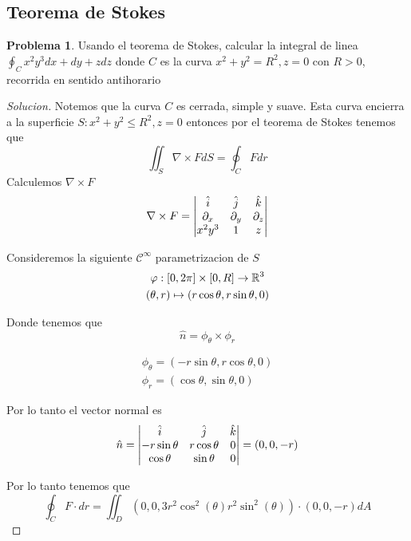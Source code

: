 \documentclass{article}
\theoremstyle{definition}
\newtheorem{problem}{Problema}
\newenvironment{solution}{\begin{proof}[Solucion]}{\end{proof}}
\begin{document}
\subsection{Teorema de Stokes}
\begin{problem}
Usando el teorema de Stokes, calcular la integral de linea $\oint_{C} x^{2}y^{3} dx + dy + z dz$ donde $C$ es la curva $x^{2} + y^{2} = R^{2}, z = 0$ con $R > 0$, recorrida en sentido antihorario
\end{problem}
\begin{solution}
  Notemos que la curva $C$ es cerrada, simple y suave. Esta curva encierra a la superficie $S: x^{2} + y^{2} \leq R^{2}, z = 0$ entonces por el teorema de Stokes tenemos que
  \begin{equation*}
    \iint_{S} \nabla \times F dS = \oint_{C} F dr
  \end{equation*}
  Calculemos $\nabla \times F$
  \begin{equation*}
    \nabla \times F = \begin{vmatrix} \hat{i} & \hat{j} & \hat{k}\\ \partial_x & \partial_y & \partial_z\\ x^{2}y^{3} & 1 & z\end{vmatrix}
  \end{equation*}

  Consideremos la siguiente $\mathcal{C}^{\infty}$ parametrizacion de $S$
  \begin{gather*}
    \varphi : [0, 2\pi] \times [0, R] \to \mathbb{R}^{3}\\
    (\theta, r) \mapsto (r \cos \theta, r \sin \theta, 0)
  \end{gather*}

  Donde tenemos que
  \begin{equation*}
    \hat{n} = \phi_{\theta} \times \phi_{r}
  \end{equation*}

  \begin{gather*}
    \phi_{\theta} = (-r \sin \theta, r \cos \theta, 0)\\
    \phi_{r} = (\cos \theta, \sin \theta, 0)
  \end{gather*}

  Por lo tanto el vector normal es
  \begin{equation*}
    \hat{n} = \begin{vmatrix} \hat{i} & \hat{j} & \hat{k}\\ -r \sin \theta & r \cos \theta & 0\\ \cos \theta & \sin \theta & 0\end{vmatrix} = (0, 0, -r)
  \end{equation*}

  Por lo tanto tenemos que
  \begin{equation*}
    \oint_{C} F \cdot dr = \iint_{D} (0, 0, 3r^{2}\cos^{2}(\theta) r^{2} \sin^{2}(\theta)) \cdot (0, 0, -r) dA
  \end{equation*}


\end{solution}
\end{document}
